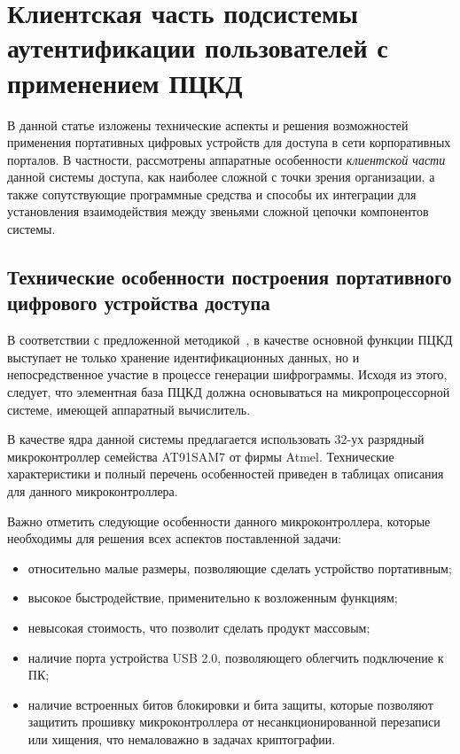 \section{Клиентская часть подсистемы аутентификации пользователей с применением
ПЦКД} 

В данной статье изложены технические аспекты и решения возможностей применения
портативных цифровых устройств для доступа в сети корпоративных порталов. В
частности, рассмотрены аппаратные особенности \textit{клиентской части} данной
системы доступа, как наиболее сложной с точки зрения организации, а также
сопутствующие программные средства и способы их интеграции для установления
взаимодействия между звеньями сложной цепочки компонентов системы.

\subsection{Технические особенности построения портативного цифрового устройства
доступа} 

В соответствии с предложенной методикой~\cite{concept_PCKD}, в качестве основной функции
ПЦКД выступает не только хранение идентификационных данных, но и непосредственное
участие в процессе генерации шифрограммы. Исходя из этого, следует, что
элементная база ПЦКД должна основываться на микропроцессорной системе, имеющей
аппаратный вычислитель.

В качестве ядра данной системы предлагается использовать 32-ух разрядный
микроконтроллер семейства AT91SAM7 от фирмы Atmel. Технические характеристики и
полный перечень особенностей приведен в таблицах описания для данного
микроконтроллера.~\cite{atmel}

Важно отметить следующие особенности данного микроконтроллера, которые
необходимы для решения всех аспектов поставленной задачи:
\begin{itemize}
  \item относительно малые размеры, позволяющие сделать устройство портативным;
  \item высокое быстродействие, применительно к возложенным функциям;
  \item невысокая стоимость, что позволит сделать продукт массовым;
  \item наличие порта устройства USB 2.0, позволяющего облегчить подключение к
  ПК;
  \item наличие  встроенных битов
блокировки и бита защиты, которые позволяют защитить прошивку микроконтроллера
от несанкционированной перезаписи или хищения, что немаловажно в задачах
криптографии.
\end{itemize}


